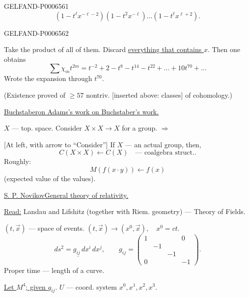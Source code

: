 \begin{GelfandAdjacentEvidence}{GELFAND-P000656}{1}
\[
(1-t^\ell x^{-\ell-2})(1-t^2x^{-\ell})\ldots(1-t^\ell x^{\ell+2}).
\]
\end{GelfandAdjacentEvidence}
\begin{GelfandAdjacentEvidence}{GELFAND-P000656}{2}


Take the product of all of them. Discard \underline{everything that contains \(x\)}. Then one obtains
\[
\sum\chi_m t^{2m}=t^{-2}+2-t^8-t^{14}-t^{22}+\ldots+10t^{70}+\ldots
\]
Wrote the expansion through \(t^{70}\).

(Existence proved of \(\geqslant57\) nontriv. [inserted above: classes] of cohomology.)

\underline{\underline{Buchstaber}}\quad \underline{on Adams’s work on Buchstaber’s work.}

\(X\) --- top. space. Consider \(X\times X\to X\) for a group.
\(\Longrightarrow\)

[At left, with arrow to “Consider”] If \(X\) --- an actual group, then,
\[
C(X\times X)\longleftarrow C(X)\quad\text{--- coalgebra struct..}
\]
Roughly:
\[
M(f(x\cdot y))\longleftarrow f(x)
\]
(expected value of the values).

\begin{center}\textemdash\enspace\textperiodcentered\enspace\textemdash\end{center}

\underline{\underline{S. P. Novikov}}\qquad \underline{General theory of relativity.}

\underline{Read:} Landau and Lifshitz (together with Riem. geometry) --- Theory of Fields.

\((t,\vec x)\) --- space of events. \((t,\vec x)\to(x^0,\vec x),\quad x^0=ct\).
\[
\underline{ds^2=g_{ij}\,dx^i\,dx^j},
\qquad
g_{ij}=\begin{pmatrix}
1&&&0\\&-1&&\\&&-1&\\0&&&-1
\end{pmatrix}.
\]
Proper time --- length of a curve.

\underline{Let \(M^4\); given \(g_{ij}\)}.\qquad
\(U\) --- coord. system \(x^0,x^1,x^2,x^3\).
\end{GelfandAdjacentEvidence}
